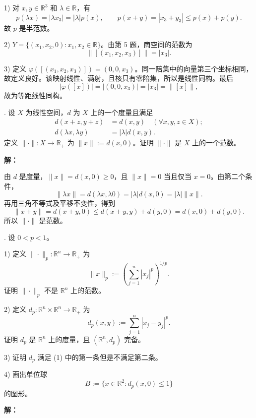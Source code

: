 \documentclass{article}
\begin{document}
1) 对 $x,y\in\mathbb R^3$ 和 $\lambda\in\mathbb R$，有
\[
p(\lambda x)=|\lambda x_3|=|\lambda|p(x),\qquad
p(x+y)=|x_3+y_3|\le p(x)+p(y).
\]
故 $p$ 是半范数。

2) $Y=\{(x_1,x_2,0):x_1,x_2\in\mathbb R\}$。由第 5 题，商空间的范数为
\[
\|[(x_1,x_2,x_3)]\|=|x_3|.
\]

3) 定义 $\varphi([(x_1,x_2,x_3)])=(0,0,x_3)$。同一陪集中的向量第三个坐标相同，故定义良好。该映射线性、满射，且核只有零陪集，所以是线性同构。最后
\[
|\varphi([x])|=|(0,0,x_3)|=|x_3|=\|[x]\|,
\]
故为等距线性同构。


\par\medskip{}. 设 $X$ 为线性空间，$d$ 为 $X$ 上的一个度量且满足
\begin{equation}
\begin{aligned}
d(x+z,y+z)&=d(x,y)\quad(\forall x,y,z\in X);\\
d(\lambda x,\lambda y)&=|\lambda|d(x,y).
\end{aligned}\tag{1}\label{eq:metric}
\end{equation}
定义 $\|\cdot\|:X\to\mathbb R_+$ 为 $\|x\|:=d(x,0)$。证明 $\|\cdot\|$ 是 $X$ 上的一个范数。


\par{}\noindent\textbf{解：}\par\nopagebreak[4]



由 $d$ 是度量，$\|x\|=d(x,0)\ge0$，且 $\|x\|=0$ 当且仅当 $x=0$。由第二个条件，
\[
\|\lambda x\|=d(\lambda x,\lambda0)=|\lambda|d(x,0)=|\lambda|\|x\|.
\]
再用三角不等式及平移不变性，得到
\[
\|x+y\|=d(x+y,0)\le d(x+y,y)+d(y,0)=d(x,0)+d(y,0).
\]
所以 $\|\cdot\|$ 是范数。


\par\medskip{}. 设 $0<p<1$。

1) 定义 $\|\cdot\|_p:\mathbb R^n\to\mathbb R_+$ 为
\[
\|x\|_p:=\left(\sum_{j=1}^n|x_j|^p\right)^{1/p}.
\]
证明 $\|\cdot\|_p$ 不是 $\mathbb R^n$ 上的范数。

2) 定义 $d_p:\mathbb R^n\times\mathbb R^n\to\mathbb R_+$ 为
\[
d_p(x,y):=\sum_{j=1}^n|x_j-y_j|^p.
\]
证明 $d_p$ 是 $\mathbb R^n$ 上的度量，且 $(\mathbb R^n,d_p)$ 完备。

3) 证明 $d_p$ 满足 (1) 中的第一条但是不满足第二条。

4) 画出单位球
\[
B:=\{x\in\mathbb R^2:d_p(x,0)\le1\}
\]
的图形。


\par{}\noindent\textbf{解：}\par\nopagebreak[4]
\end{document}
